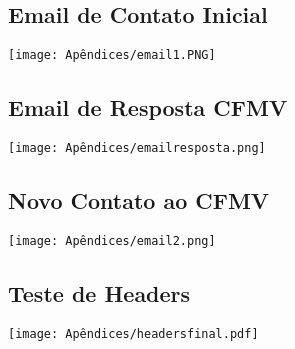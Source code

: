 \documentclass[
    12pt,               %
    openright,          %
    oneside,
    a4paper,            %
    BIBLATEX,           %
    TODO,               %
    english,            %
    brazil              %
    ]{ifsp-spo-inf-ctds}
\begin{document}
\begin{apendicesenv}

\partapendices



\begin {appendices}
\chapter{Email de Contato Inicial}



\texttt{[image: Apêndices/email1.PNG]}

\newpage
\label{apendiceA}
\end{appendices}

\begin {appendices}
\chapter{Email de Resposta CFMV}
\texttt{[image: Apêndices/emailresposta.png]}

\newpage
\label{apendiceB}
\end{appendices}
\newpage

\begin {appendices}
\chapter{Novo Contato ao CFMV}


\texttt{[image: Apêndices/email2.png]}

\label{apendiceC}
\end{appendices}

\begin {appendices}
\chapter{Teste de Headers}
\texttt{[image: Apêndices/headersfinal.pdf]}
\label{apendiceD}
\end{appendices}


\end{apendicesenv}
\end{document}
